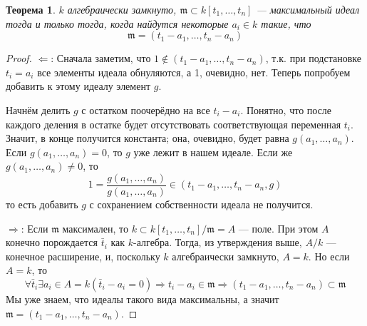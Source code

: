 \documentclass{article}
\newtheorem*{theorem}{Теорема}
\theoremstyle{definition}
\theoremstyle{remark}
\newcommand{\Ra}{\Rightarrow}
\newcommand{\La}{\Leftarrow}
\newcommand{\m}{\mathfrak{m}}
\begin{document}
\begin{theorem}
    $k$ алгебраически замкнуто, $\m \subset k[t_1, \hdots, t_n]$ --- максимальный идеал тогда и только тогда, когда найдутся некоторые $a_i \in k$ такие, что
    \begin{equation*}
        \m = (t_1 - a_1, \hdots, t_n - a_n)
    \end{equation*}
\end{theorem}
\begin{proof}
    $\La$: Сначала заметим, что $1 \notin (t_1 - a_1, \hdots, t_n - a_n)$, т.к. при подстановке $t_i = a_i$ все элементы идеала обнуляются, а 1, очевидно, нет. Теперь попробуем добавить к этому идеалу элемент $g$.
    
    Начнём делить $g$ с остатком поочерёдно на все $t_i - a_i$. Понятно, что после каждого деления в остатке будет отсутствовать соответствующая переменная $t_i$. Значит, в конце получится константа; она, очевидно, будет равна $g(a_1, \hdots, a_n)$. Если $g(a_1, \hdots, a_n) = 0$, то $g$ уже лежит в нашем идеале. Если же $g(a_1, \hdots, a_n) \neq 0$, то
    \begin{equation*}
        1 = \frac{g(a_1, \hdots, a_n)}{g(a_1, \hdots, a_n)} \in (t_1 - a_1, \hdots, t_n - a_n, g)
    \end{equation*}
    то есть добавить $g$ с сохранением собственности идеала не получится.

	$\Ra$: Если $\m$ максимален, то $k \subset k[t_1, \hdots, t_n] / \m = A$ --- поле. При этом $A$ конечно порождается $\bar{t}_i$ как $k$-алгебра. Тогда, из утверждения выше, $A / k$ --- конечное расширение, и, поскольку $k$ алгебраически замкнуто, $A = k$. Но если $A = k$, то
    \begin{equation*}
	\forall \bar{t}_i \exists a_i \in A = k \left( \bar{t}_i - a_i = 0 \right) \Ra t_i - a_i \in \m \Ra (t_1 - a_1, \hdots, t_n - a_n) \subset \m
    \end{equation*}
    Мы уже знаем, что идеалы такого вида максимальны, а значит $\m = (t_1 - a_1, \hdots, t_n - a_n)$.
\end{proof}
\end{document}
